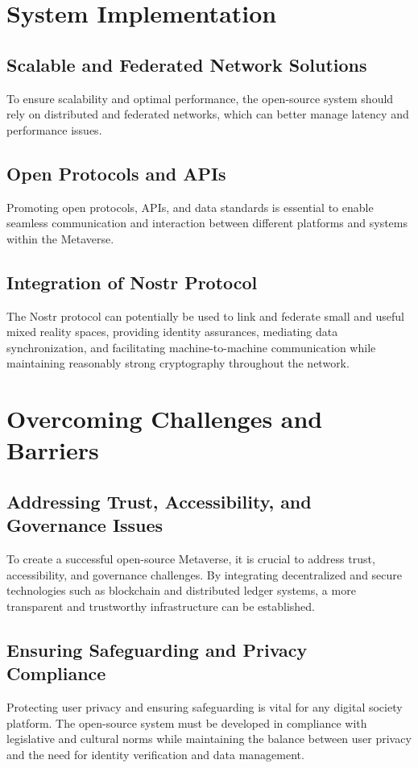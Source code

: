 \section{System Implementation}
\subsection{Scalable and Federated Network Solutions}
To ensure scalability and optimal performance, the open-source system should rely on distributed and federated networks, which can better manage latency and performance issues.
\subsection{Open Protocols and APIs}
Promoting open protocols, APIs, and data standards is essential to enable seamless communication and interaction between different platforms and systems within the Metaverse.
\subsection{Integration of Nostr Protocol}
The Nostr protocol can potentially be used to link and federate small and useful mixed reality spaces, providing identity assurances, mediating data synchronization, and facilitating machine-to-machine communication while maintaining reasonably strong cryptography throughout the network.



\section{Overcoming Challenges and Barriers}
\subsection{Addressing Trust, Accessibility, and Governance Issues}
To create a successful open-source Metaverse, it is crucial to address trust, accessibility, and governance challenges. By integrating decentralized and secure technologies such as blockchain and distributed ledger systems, a more transparent and trustworthy infrastructure can be established.

\subsection{Ensuring Safeguarding and Privacy Compliance}
Protecting user privacy and ensuring safeguarding is vital for any digital society platform. The open-source system must be developed in compliance with legislative and cultural norms while maintaining the balance between user privacy and the need for identity verification and data management.

